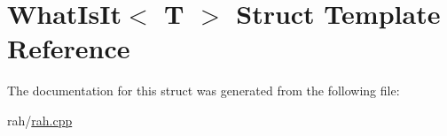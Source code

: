 \hypertarget{struct_what_is_it}{}\section{What\+Is\+It$<$ T $>$ Struct Template Reference}
\label{struct_what_is_it}


The documentation for this struct was generated from the following file\+:\begin{DoxyCompactItemize}
\item 
rah/\mbox{\hyperlink{rah_8cpp}{rah.\+cpp}}\end{DoxyCompactItemize}
